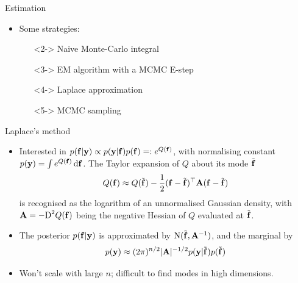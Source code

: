 \begin{frame}{Estimation}
  \vspace{3pt}
  \begin{itemize}
    \item<2-> Some strategies:
    \begin{itemize}
      \item[\xmark]<2-> Naive Monte-Carlo integral
      \item[\xmark]<3-> EM algorithm with a MCMC E-step
      \item[{\color{FUorange}\cmark}]<4-> Laplace approximation
      \item[{\color{FUorange}\cmark}]<5-> MCMC sampling
    \end{itemize}
  \end{itemize}
\end{frame}


\begin{frame}{Laplace's method}
  \vspace{-15pt}
  \begin{itemize}\setlength\itemsep{0.8em}
    \item Interested in $p({\mathbf f}|{\mathbf y}) \propto p({\mathbf y}|{\mathbf f})p({\mathbf f}) =: e^{Q({\mathbf f})}$, with normalising constant $p({\mathbf y}) = \int e^{Q({\mathbf f})} \, \text{d}{\mathbf f}$. The Taylor expansion of $Q$ about its mode $\tilde{{\mathbf f}}$
    \[
      Q({\mathbf f}) \approx Q(\tilde{{\mathbf f}}) - \frac{1}{2} ({\mathbf f} - \tilde{{\mathbf f}})^\top{\mathbf A}({\mathbf f} - \tilde{{\mathbf f}}) 
    \]
    is recognised as the logarithm of an unnormalised Gaussian density, with ${\mathbf A} = -\text{D}^2 Q({\mathbf f})$ being the negative Hessian of $Q$ evaluated at  $\tilde{{\mathbf f}}$.
    \item The posterior $p({\mathbf f}|{\mathbf y})$ is approximated by $\operatorname{N}(\tilde{{\mathbf f}}, {\mathbf A}^{-1})$, and the marginal by
    \[
      p({\mathbf y}) \approx (2\pi)^{n/2} \vert {\mathbf A} \vert^{-1/2}  p({\mathbf y}|\tilde{{\mathbf f}})p(\tilde{{\mathbf f}})
    \]
    \item Won't scale with large $n$; difficult to find modes in high dimensions.
  \end{itemize}
\end{frame}

